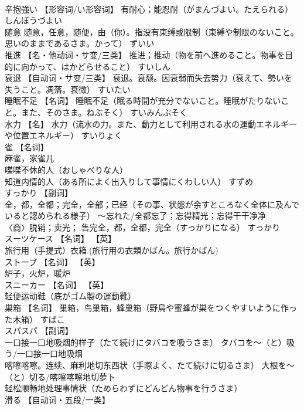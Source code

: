 \documentclass[8pt]{extreport}
\begin{document}
\begin{CJK}{UTF8}{min}
\\	辛抱強い	【形容词/い形容词】 有耐心；能忍耐（がまんづよい。たえられる）	しんぼうづよい	
\\	随意	随意，任意，随便，由（你）。指没有束缚或限制（束縛や制限のないこと。思いのままであるさま。かって）	ずいい	
\\	推進	【名・他动词・サ变/三类】 推进；推动（物を前へ進めること。物事を目的に向かって、はかどらせること）	すいしん	
\\	衰退	【自动词・サ变/三类】 衰退。衰颓。因衰弱而失去势力（衰えて、勢いを失うこと。凋落。衰微）	すいたい	
\\	睡眠不足	【名词】 睡眠不足（眠る時間が充分でないこと。睡眠がたりないこと。また、そのさま。ねぶそく）	すいみんぶそく	
\\	水力	【名】 水力（流水の力。また、動力として利用される水の運動エネルギーや位置エネルギー）	すいりょく	
\\	雀	【名词】 
\\	麻雀，家雀儿 
\\	喋喋不休的人（おしゃべりな人） 
\\	知道内情的人（ある所によく出入りして事情にくわしい人）	すずめ	
\\	すっかり	【副词】 
\\	全，都，全都；完全，全部；已经（その事、状態が余すところなく全体に及んでいると認められる様子） ～忘れた/全都忘了；忘得精光；忘得干干净净 
\\	〈商〉脱销；卖光； 售完全，都，全都，完全（すっかりになる）	すっかり	
\\	スーツケース	【名词】 【英】
\\	旅行用（手提式）衣箱.(旅行用の衣類かばん。旅行かばん)		
\\	ストーブ	【名词】 【英】
\\	炉子，火炉，暖炉		
\\	スニーカー	【名词】 【英】
\\	轻便运动鞋（底がゴム製の運動靴）		
\\	巣箱	【名词】 巢箱，鸟巢箱，蜂巢箱（野鳥や蜜蜂が巣をつくやすいように作った木箱）	すばこ	
\\	スパスパ	【副词】 
\\	一口接一口地吸烟的样子（たて続けにタバコを吸うさま） タバコを～（と）吸う/一口接一口地吸烟 
\\	喀嚓喀嚓。连续、麻利地切东西状（手際よく、たて続けに切るさま） 大根を～（と）切る/喀嚓喀嚓地切萝卜 
\\	轻松顺畅地处理事情状（ためらわずにどんどん物事を行うさま）		
\\	滑る	【自动词・五段/一类】 

\end{CJK}
\end{document}
